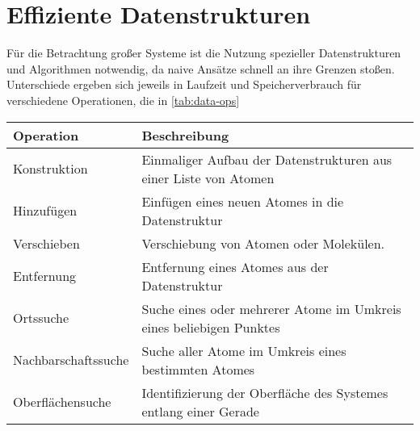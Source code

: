 \section{Effiziente Datenstrukturen}

Für die Betrachtung großer Systeme ist die Nutzung spezieller Datenstrukturen und Algorithmen notwendig, da naive Ansätze schnell an ihre Grenzen stoßen.
Unterschiede ergeben sich jeweils in Laufzeit und Speicherverbrauch für verschiedene Operationen, die in \ref{tab:data-ops}

\begin{table}
  \centering
  \begin{tabularx}{\textwidth}{|l|X|}
    \hline
    Operation & Beschreibung \\
    \hline

    Konstruktion & Einmaliger Aufbau der Datenstrukturen aus einer Liste von Atomen \\

    Hinzufügen & Einfügen eines neuen Atomes in die Datenstruktur \\

    Verschieben & Verschiebung von Atomen oder Molekülen. \\

    Entfernung & Entfernung eines Atomes aus der Datenstruktur \\

    Ortssuche & Suche eines oder mehrerer Atome im Umkreis eines beliebigen Punktes \\

    Nachbarschaftssuche & Suche aller Atome im Umkreis eines bestimmten Atomes \\

    Oberflächensuche & Identifizierung der Oberfläche des Systemes entlang einer Gerade \\

    \hline
  \end{tabularx}
\end{table}

